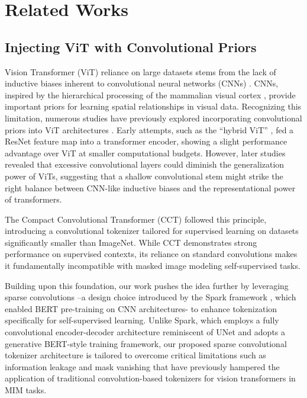\section{Related Works}
\subsection{Injecting ViT with Convolutional Priors}
Vision Transformer (ViT) reliance on large datasets stems from the lack of inductive biases inherent to convolutional neural networks (CNNs) \citep{dosovitskiy_image_2021}. CNNs, inspired by the hierarchical processing of the mammalian visual cortex \citep{hubel_receptive_1959, fukushima_neocognitron_1988}, provide important priors for learning spatial relationships in visual data. Recognizing this limitation, numerous studies have previously explored incorporating convolutional priors into ViT architectures \citep{wu_cvt_2021, chen_visformer_2021, yuan_incorporating_2021, graham_levit_2021}. Early attempts, such as the “hybrid ViT” \citep{dosovitskiy_image_2021}, fed a ResNet \citep{he2016deep} feature map into a transformer encoder, showing a slight performance advantage over ViT at smaller computational budgets. However, later studies \citep{xiao2021early} revealed that excessive convolutional layers could diminish the generalization power of ViTs, suggesting that a shallow convolutional stem might strike the right balance between CNN-like inductive biases and the representational power of transformers.

The Compact Convolutional Transformer (CCT) \citep{hassani_escaping_2022} followed this principle, introducing a convolutional tokenizer tailored for supervised learning on datasets significantly smaller than ImageNet. While CCT demonstrates strong performance on supervised contexts, its reliance on standard convolutions makes it fundamentally incompatible with masked image modeling self-supervised tasks. 

Building upon this foundation, our work pushes the idea further by leveraging sparse convolutions \citep{liu_sparse_2015} –a design choice introduced by the Spark framework \citep{tian_designing_2023}, which enabled BERT pre-training on CNN architectures- to enhance tokenization specifically for self-supervised learning. Unlike Spark, which employs a fully convolutional encoder-decoder architecture reminiscent of UNet and adopts a generative BERT-style training framework, our proposed sparse convolutional tokenizer architecture is tailored to overcome critical limitations such as information leakage and mask vanishing that have previously hampered the application of traditional convolution-based tokenizers for vision transformers in MIM tasks.

